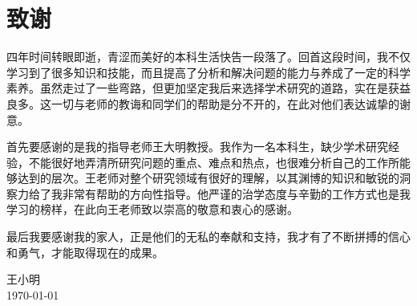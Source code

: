 
\chapter{致谢}

四年时间转眼即逝，青涩而美好的本科生活快告一段落了。回首这段时间，我不仅学习到了很多知识和技能，而且提高了分析和解决问题的能力与养成了一定的科学素养。虽然走过了一些弯路，但更加坚定我后来选择学术研究的道路，实在是获益良多。这一切与老师的教诲和同学们的帮助是分不开的，在此对他们表达诚挚的谢意。

首先要感谢的是我的指导老师王大明教授。我作为一名本科生，缺少学术研究经验，不能很好地弄清所研究问题的重点、难点和热点，也很难分析自己的工作所能够达到的层次。王老师对整个研究领域有很好的理解，以其渊博的知识和敏锐的洞察力给了我非常有帮助的方向性指导。他严谨的治学态度与辛勤的工作方式也是我学习的榜样，在此向王老师致以崇高的敬意和衷心的感谢。

最后我要感谢我的家人，正是他们的无私的奉献和支持，我才有了不断拼搏的信心和勇气，才能取得现在的成果。

\vskip 108pt
\begin{flushright}
    王小明\makebox[1cm]{} \\
    \today
\end{flushright}

